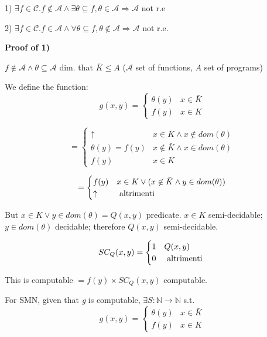 \documentclass{amsbook}
\newcommand{\nat}{\ensuremath{\mathbb{N}}}
\theoremstyle{definition}
\theoremstyle{remark}
\numberwithin{section}{chapter}
\numberwithin{equation}{chapter}
\begin{document}
1) $ \exists f \in \mathcal{C}. f \not\in \mathcal{A} \land \exists\theta\subseteq f, \theta\in\mathcal{A} \Rightarrow \mathcal{A}$ not r.e

2) $ \exists f \in \mathcal{C}. f\in\mathcal{A} \land \forall\theta\subseteq f, \theta\not\in\mathcal{A}\Rightarrow \mathcal{A} $ not r.e.

\textbf{Proof of 1)}

$ f\not\in \mathcal{A} \land \theta\subseteq \mathcal{A}$ dim. that $ \bar{K}\leq A $ ($ \mathcal{A} $ set of functions, $A$ set of programs)

We define the function:
\begin{equation*}
	g(x,y) = \begin{cases}
		\theta(y) & x \in \bar{K} \\
		f(y)      & x \in K
	\end{cases}
\end{equation*}

\begin{equation*}
	= \begin{cases}
		\uparrow         & x \in \bar{K} \land x \not\in dom(\theta) \\
		\theta(y) = f(y) & x \not\in \bar{K} \land x \in dom(\theta) \\
		f(y)             & x\in K
	\end{cases}
\end{equation*}

\begin{equation*}
	= \begin{cases}
		f(y)     & x\in K\lor(x\not\in\bar{K}\land y\in dom(\theta)) \\
		\uparrow & $ altrimenti $
	\end{cases}
\end{equation*}

But $ x\in K\lor y\in dom(\theta) = Q(x,y)$ predicate. $ x\in K $ semi-decidable; $ y \in dom(\theta) $ decidable; therefore $ Q(x,y) $ semi-decidable.

\begin{equation*}
	SC_Q(x,y) = \begin{cases}
		1 & Q(x,y)         \\
		0 & $ altrimenti $
	\end{cases}
\end{equation*}

This is computable $ = f(y) \times SC_Q(x,y) $ computable.

For SMN, given that \textit{g} is computable, $ \exists S:\nat\rightarrow\nat $ s.t.
\begin{equation*}
	g(x,y) = \begin{cases}
		\theta(y) & x \in \bar{K} \\
		f(y)      & x \in K
	\end{cases}
\end{equation*}
\end{document}
